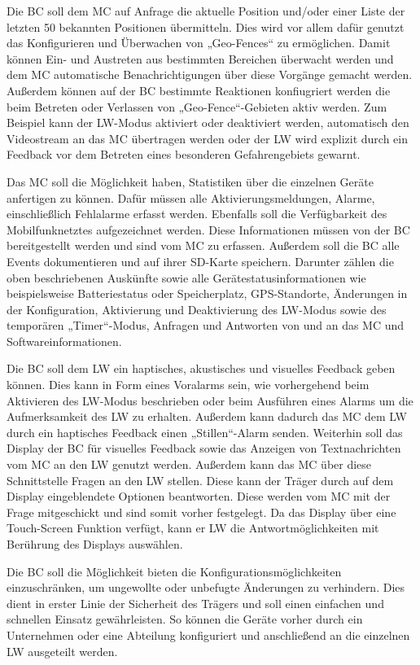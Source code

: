 \documentclass[thesis.tex]{subfiles}
\begin{document}
Die BC soll dem MC auf Anfrage die aktuelle Position und/oder einer Liste der letzten 50 bekannten Positionen übermitteln.
Dies wird vor allem dafür genutzt das Konfigurieren und Überwachen von „Geo-Fences“ zu ermöglichen.
Damit können Ein- und Austreten aus bestimmten Bereichen überwacht werden und dem MC automatische Benachrichtigungen
über diese Vorgänge gemacht werden.
Außerdem können auf der BC bestimmte Reaktionen konfiugriert werden die beim Betreten oder Verlassen von „Geo-Fence“-Gebieten aktiv werden.
Zum Beispiel kann der LW-Modus aktiviert oder deaktiviert werden, automatisch den Videostream an das MC übertragen werden
oder der LW wird explizit durch ein Feedback vor dem Betreten eines besonderen Gefahrengebiets gewarnt.

Das MC soll die Möglichkeit haben, Statistiken über die einzelnen Geräte anfertigen zu können.
Dafür müssen alle Aktivierungsmeldungen, Alarme, einschließlich Fehlalarme erfasst werden.
Ebenfalls soll die Verfügbarkeit des Mobilfunknetztes aufgezeichnet werden.
Diese Informationen müssen von der BC bereitgestellt werden und sind vom MC zu erfassen.
Außerdem soll die BC alle Events dokumentieren und auf ihrer SD-Karte speichern.
Darunter zählen die oben beschriebenen Auskünfte sowie alle Gerätestatusinformationen wie beispielsweise Batteriestatus
oder Speicherplatz, GPS-Standorte, Änderungen in der Konfiguration, Aktivierung und Deaktivierung des LW-Modus
sowie des temporären „Timer“-Modus, Anfragen und Antworten von und an das MC und Softwareinformationen.

Die BC soll dem LW ein haptisches, akustisches und visuelles Feedback geben können.
Dies kann in Form eines Voralarms sein, wie vorhergehend beim Aktivieren des LW-Modus beschrieben oder beim Ausführen eines Alarms
um die Aufmerksamkeit des LW zu erhalten.
Außerdem kann dadurch das MC dem LW durch ein haptisches Feedback einen „Stillen“-Alarm senden.
Weiterhin soll das Display der BC für visuelles Feedback sowie das Anzeigen von Textnachrichten vom MC an den LW genutzt werden.
Außerdem kann das MC über diese Schnittstelle Fragen an den LW stellen.
Diese kann der Träger durch auf dem Display eingeblendete Optionen beantworten.
Diese werden vom MC mit der Frage mitgeschickt und sind somit vorher festgelegt.
Da das Display über eine Touch-Screen Funktion verfügt, kann er LW die Antwortmöglichkeiten mit Berührung des Displays auswählen.

Die BC soll die Möglichkeit bieten die Konfigurationsmöglichkeiten einzuschränken, um ungewollte oder unbefugte Änderungen zu verhindern.
Dies dient in erster Linie der Sicherheit des Trägers und soll einen einfachen und schnellen Einsatz gewährleisten.
So können die Geräte vorher durch ein Unternehmen oder eine Abteilung konfiguriert und anschließend an die einzelnen LW ausgeteilt werden.


\subfilebib %
\end{document}
